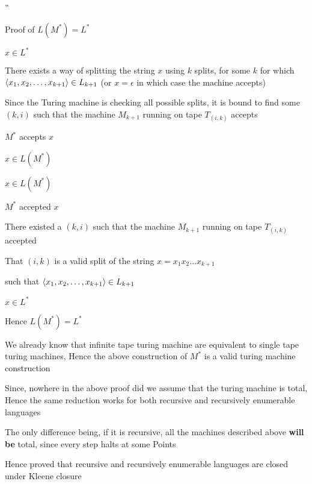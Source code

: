 ''

Proof of $L(M^*) = L^*$

$x \in L^*$

\imp
There exists a way of splitting the string $x$ using $k$ splits, for some $k$ for which $\langle x_1, x_2, \dots, x_{k + 1} \rangle \in L_{k + 1}$ (or $x = \epsilon$ in which case the machine accepts)

\imp
Since the Turing machine is checking all possible splits, it is bound to find some $(k, i)$ such that the machine $M_{k + 1}$ running on tape $T_{(i, k)}$ accepts

\imp
$M^*$ accepts $x$

\imp
$x \in L(M^*)$


$x \in L(M^*)$

\imp
$M^*$ accepted $x$

\imp
There existed a $(k, i)$ such that the machine $M_{k + 1}$ running on tape $T_{(i, k)}$ accepted

\imp
That $(i, k)$ is a valid split of the string $x = x_1x_2\dots x_{k + 1}$ 

such that $\langle x_1, x_2, \dots, x_{k + 1} \rangle \in L_{k + 1}$


\imp
$x \in L^*$

Hence $L(M^*) = L^*$

We already know that infinite tape turing machine are equivalent to single tape turing machines, Hence the above construction of $M^*$ is a valid turing machine construction


Since, nowhere in the above proof did we assume that the turing machine is total, Hence the same reduction works for both recursive and recursively enumerable languages

The only difference being, if it is recursive, all the machines described above \textbf{will be} total, since every step halts at some Points


Hence proved that recursive and recursively enumerable languages are closed under Kleene closure

















